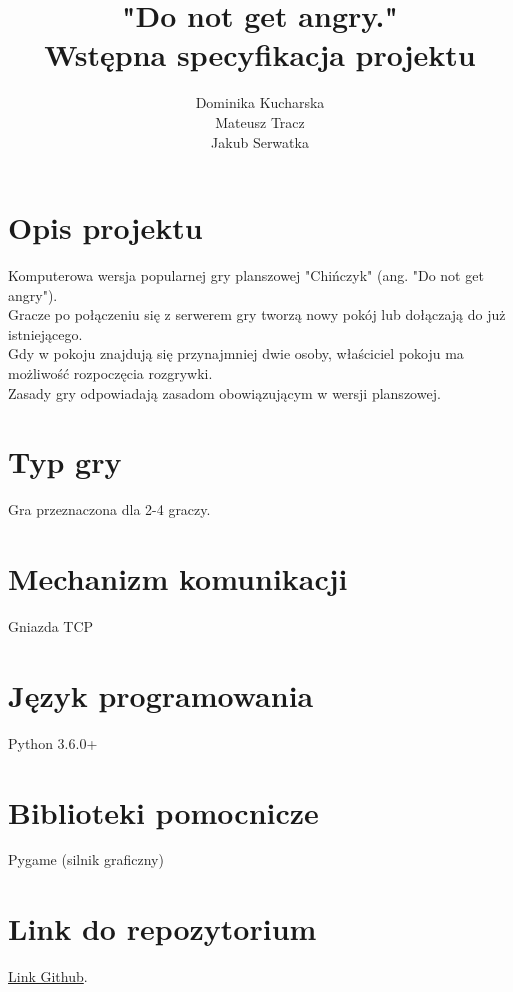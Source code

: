\documentclass[12pt]{article}
\title{{\Huge \vspace{-4cm} \textbf{"Do not get angry."}} \\ {\Large Wstępna specyfikacja projektu}}
\author{Dominika Kucharska \\ Mateusz Tracz \\ Jakub Serwatka}
\date{}
\begin{document}
\maketitle
\vspace{1mm}

\section{Opis projektu}
Komputerowa wersja popularnej gry planszowej "Chińczyk" (ang. "Do not get angry"). \\
Gracze po połączeniu się z serwerem gry tworzą nowy pokój lub dołączają do już istniejącego. \\
Gdy w pokoju znajdują się przynajmniej dwie osoby, właściciel pokoju ma możliwość rozpoczęcia rozgrywki. \\
Zasady gry odpowiadają zasadom obowiązującym w wersji planszowej. 

\section{Typ gry}
Gra przeznaczona dla 2-4 graczy.

\section{Mechanizm komunikacji}
Gniazda TCP

\section{Język programowania}
Python 3.6.0+

\section{Biblioteki pomocnicze}
Pygame (silnik graficzny)

\section{Link do repozytorium}
\href{https://github.com/matishadow/DoNotGetAngry}{Link Github}. 
\end{document}

